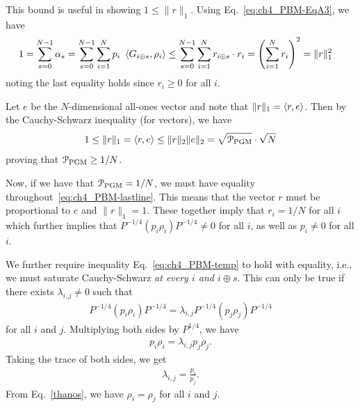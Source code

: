 This bound is useful in showing $1 \leq \| r \|_1$. 
Using Eq.~\eqref{eq:ch4_PBM-EqA3}, we have 
\begin{equation}
    \begin{aligned}
        1 = \sum_{s=0}^{N-1} \alpha_s & = \sum_{s=0}^{N-1} \sum_{i=1}^N p_i \ \left\langle G_{i \oplus s}, \rho_i \right\rangle
         \leq \sum_{s=0}^{N-1} \sum_{i=1}^N r_{i \oplus s} \cdot r_i
         = \left( \sum_{i=1}^N r_i \right)^2 
         = \| r \|_1^2 
    \end{aligned} 
\end{equation}
noting the last equality holds since $r_i \geq 0$ for all $i$. 


Let $e$ be the $N$-dimensional all-ones vector and note that $\| r \|_1 = \left\langle r, e \right\rangle$. 
Then by the Cauchy-Schwarz inequality (for vectors), we have 
\begin{equation} \label{eq:ch4_PBM-lastline}
1 \leq \| r \|_1 = \left\langle r, e \right\rangle \leq \| r \|_2 \| e \|_2 = \sqrt{\mathcal{P}_{\mathrm{PGM}}} \cdot \sqrt{N} 
\end{equation} 
proving that $\mathcal{P}_{\mathrm{PGM}} \geq 1/N$.%


Now, if we have that $\mathcal{P}_{\mathrm{PGM}} = 1/N$, we must have equality throughout~\eqref{eq:ch4_PBM-lastline}. 
This means that the vector $r$ must be proportional to $e$ and $\| r \|_1 = 1$. 
These together imply that $r_i = 1/N$ for all $i$ which further implies that $P^{-1/4} (p_i \rho_i) P^{-1/4} \neq 0$ for all $i$, as well as $p_i \neq 0$ for all $i$. 

We further require inequality Eq.~\eqref{eq:ch4_PBM-temp} to hold with equality, i.e., we must saturate Cauchy-Schwarz \emph{at every $i$ and $i \oplus s$}. 
This can only be true if there exists $\lambda_{i,j} \neq 0$ such that 
\begin{align}
    P^{-1/4} (p_i \rho_i) P^{-1/4} = \lambda_{i,j} P^{-1/4} (p_{j} \rho_{j}) P^{-1/4}   
\end{align} 
for all $i$ and $j$. 
Multiplying both sides by $P^{1/4}$, we have 
\begin{align} \label{thanos}
    p_i \rho_i = \lambda_{i,j} p_{j} \rho_{j}. 
\end{align} 
Taking the trace of both sides, we get 
\begin{align}
    \lambda_{i,j} = \frac{p_i}{p_j}. 
\end{align} 
From Eq.~\eqref{thanos}, we have $\rho_i = \rho_j$ for all $i$ and $j$. 

